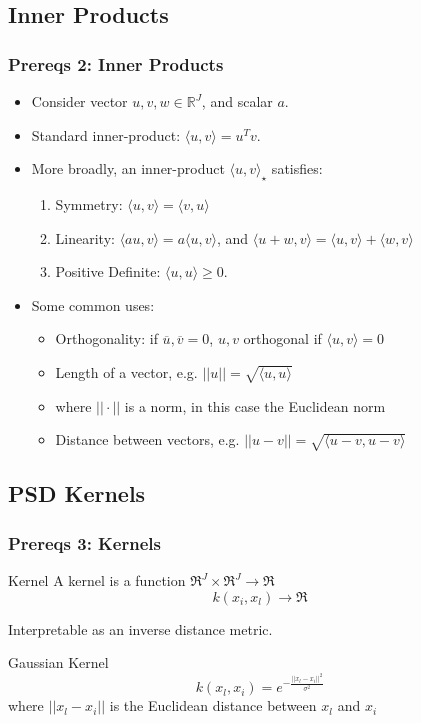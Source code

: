\documentclass{beamer}
\numberwithin{equation}{section}
\begin{document}
\subsection{Inner Products}
\begin{frame}
\frametitle{Prereqs 2: Inner Products}
\begin{itemize}
\item<2->[] \hspace{-.2in} Consider vector $u,v,w\in \mathbb{R}^J$, and scalar $a$.
\item<3-> Standard inner-product: $\langle u,v \rangle =u^T v$.
\item<4-> More broadly, an inner-product $\langle u,v \rangle_\star$ satisfies:
\begin{enumerate}
\item<5-> Symmetry: $\langle u,v \rangle=\langle v,u \rangle$
\item<5-> Linearity: $\langle au,v \rangle=a\langle u,v\rangle$, and $\langle u+w,v\rangle=\langle u,v\rangle+\langle w,v\rangle$
\item<5-> Positive Definite:  $\langle u,u \rangle \geq 0$.
\end{enumerate}
\bigskip
\item<7-> Some common uses:
\begin{itemize}
\item<8-> Orthogonality: if $\overline{u},\overline{v}=0$, $u,v$ orthogonal if $\langle u,v \rangle=0$
\smallskip
\item<8-> Length of a vector, e.g. $||u||=\sqrt{\langle u,u \rangle}$
\smallskip
\item<8->[] \footnotesize{where $||\cdot||$ is a norm, in this case the Euclidean norm}
\smallskip
\item<8-> Distance between vectors, e.g. $||u-v||=\sqrt{\langle u-v,u-v \rangle}$
\end{itemize}
\end{itemize}
\end{frame}

\subsection{PSD Kernels}
\begin{frame}
\frametitle{Prereqs 3: Kernels}
\vspace{-.3in}
\footnotesize{
\begin{block}{Kernel}
A kernel is a function $\Re^{J} \times \Re^{J} \rightarrow \Re$ \\
$$ k(x_i,x_l)\rightarrow \Re $$
\end{block}}
\pause
Interpretable as an inverse distance metric.  
\footnotesize
\begin{block}{Gaussian Kernel}
$$k(x_l,x_i)=e^{-\frac{||x_l-x_i||^2}{\sigma^2}}$$
where $||x_l-x_i||$ is the Euclidean distance between $x_l$ and $x_i$
\end{block}
\end{frame}
\end{document}
